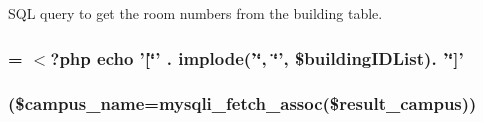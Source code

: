 \-S\-Q\-L query to get the room numbers from the building table. \hypertarget{manage_8php_aaa4523e3eb6e4848efff15be60f7f802}{
\subsubsection[{build\-Nums}]{ = $<$?php echo '\mbox{[}\char`\"{}' . implode('\char`\"{}, \char`\"{}', \$building\-I\-D\-List). '\char`\"{}\mbox{]}'}}\label{manage_8php_aaa4523e3eb6e4848efff15be60f7f802}
\hypertarget{manage_8php_aab1672b501262d8a7c242d2c87e1a361}{
\subsubsection[{while}]{(\$campus\-\_\-name=mysqli\-\_\-fetch\-\_\-assoc(\$result\-\_\-campus))}}\label{manage_8php_aab1672b501262d8a7c242d2c87e1a361}
